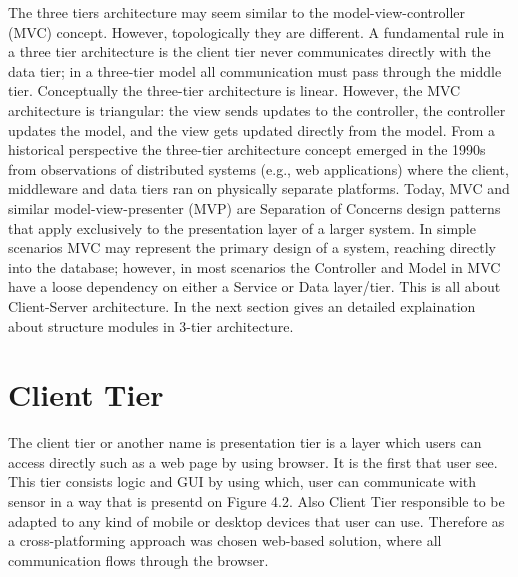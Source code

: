 \newline
The three tiers architecture may seem similar to the model-view-controller (MVC) concept. However, topologically they are different. A fundamental rule in a three tier architecture is the client tier never communicates directly with the data tier; in a three-tier model all communication must pass through the middle tier. Conceptually the three-tier architecture is linear. However, the MVC architecture is triangular: the view sends updates to the controller, the controller updates the model, and the view gets updated directly from the model.
From a historical perspective the three-tier architecture concept emerged in the 1990s from observations of distributed systems (e.g., web applications) where the client, middleware and data tiers ran on physically separate platforms. Today, MVC and similar model-view-presenter (MVP) are Separation of Concerns design patterns that apply exclusively to the presentation layer of a larger system. In simple scenarios MVC may represent the primary design of a system, reaching directly into the database; however, in most scenarios the Controller and Model in MVC have a loose dependency on either a Service or Data layer/tier. This is all about Client-Server architecture.
\newline
In the next section gives an detailed explaination about structure modules in 3-tier architecture.

\section{Client Tier}
  The client tier or another name is presentation tier is a layer which users can access directly such as a web page by using browser. It is the first that user see. This tier consists logic and GUI by using which, user can communicate with sensor in a way that is presentd on Figure 4.2. Also Client Tier responsible to be adapted to any kind of mobile or desktop devices that user can use. Therefore as a cross-platforming approach was chosen web-based solution, where all communication flows through the browser.

